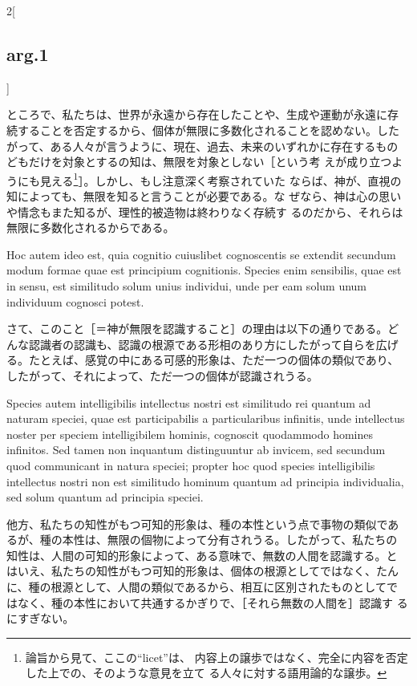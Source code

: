 \documentclass[paper=a4paper,fontsize=10pt,jafontsize=9pt,titlepage]{jlreq}
\begin{document}
\begin{paracol}{2}[\subsection{arg.1}]
\switchcolumn

ところで、私たちは、世界が永遠から存在したことや、生成や運動が永遠に存
続することを否定するから、個体が無限に多数化されることを認めない。した
がって、ある人々が言うように、現在、過去、未来のいずれかに存在するもの
どもだけを対象とするの知は、無限を対象としない［という考
えが成り立つようにも見える\footnote{論旨から見て、ここの``licet''は、
内容上の譲歩ではなく、完全に内容を否定した上での、そのような意見を立て
る人々に対する語用論的な譲歩。}］。しかし、もし注意深く考察されていた
ならば、神が、直視の知によっても、無限を知ると言うことが必要である。な
ぜなら、神は心の思いや情念もまた知るが、理性的被造物は終わりなく存続す
るのだから、それらは無限に多数化されるからである。

\switchcolumn*

Hoc autem ideo est, quia cognitio cuiuslibet cognoscentis se extendit
secundum modum formae quae est principium cognitionis. Species enim
sensibilis, quae est in sensu, est similitudo solum unius individui,
unde per eam solum unum individuum cognosci potest.

\switchcolumn

さて、このこと［＝神が無限を認識すること］の理由は以下の通りである。ど
んな認識者の認識も、認識の根源である形相のあり方にしたがって自らを広げ
る。たとえば、感覚の中にある可感的形象は、ただ一つの個体の類似であり、
したがって、それによって、ただ一つの個体が認識されうる。

\switchcolumn*

Species autem intelligibilis intellectus nostri est similitudo rei
quantum ad naturam speciei, quae est participabilis a particularibus
infinitis, unde intellectus noster per speciem intelligibilem hominis,
cognoscit quodammodo homines infinitos. Sed tamen non inquantum
distinguuntur ab invicem, sed secundum quod communicant in natura
speciei; propter hoc quod species intelligibilis intellectus nostri
non est similitudo hominum quantum ad principia individualia, sed
solum quantum ad principia speciei.

\switchcolumn

他方、私たちの知性がもつ可知的形象は、種の本性という点で事物の類似であ
るが、種の本性は、無限の個物によって分有されうる。したがって、私たちの
知性は、人間の可知的形象によって、ある意味で、無数の人間を認識する。と
はいえ、私たちの知性がもつ可知的形象は、個体の根源としてではなく、たん
に、種の根源として、人間の類似であるから、相互に区別されたものとしてで
はなく、種の本性において共通するかぎりで、［それら無数の人間を］認識す
るにすぎない。


\end{paracol}
\end{document}
